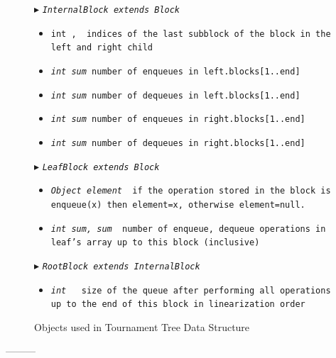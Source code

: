 \begin{figure}
\begin{algorithmic}[1]
\Statex $\blacktriangleright$ \tt{\sl{InternalBlock} extends \sl{Block}} 
\begin{itemize}
    \item \tt{int} \eleft, \eright
  \textsf{\com\ indices of the last subblock of the block in the left and right child}
  \item \tt{\sl{int} sum}\textsf{\com\ number of enqueues in \tt{left.blocks[1..end]}}
  \item \tt{\sl{int} sum}\textsf{\com\ number of dequeues in \tt{left.blocks[1..end]}}
  \item \tt{\sl{int} sum}\textsf{\com\ number of enqueues in \tt{right.blocks[1..end]}}
  \item \tt{\sl{int} sum}\textsf{\com\ number of dequeues in \tt{right.blocks[1..end]}}
\end{itemize}

\Statex $\blacktriangleright$ \tt{\sl{LeafBlock} extends \sl{Block}} 
\begin{itemize}
  \item \tt{\sl{Object} element}
  \textsf{\com\ if the operation stored in the block is \tt{enqueue(x)} then \tt{element=x}, otherwise \tt{element=null}.}
  
    \item \tt{\sl{int} sum, sum}
  \textsf{\com\ number of enqueue, dequeue operations in  leaf's  array up to this block (inclusive)}
\end{itemize}

\Statex $\blacktriangleright$ \tt{\sl{RootBlock} extends \sl{InternalBlock}} 
\begin{itemize}
  \item \tt{\sl{int} \size}%
  \textsf{\com\ size of the queue after performing all operations up to the end of this block in linearization order}
\end{itemize}

\end{algorithmic}
\caption{Objects used in Tournament Tree Data Structure \label{object-fields}}
\end{figure}

---------


